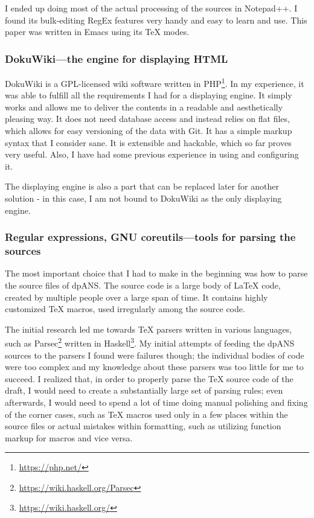 I ended up doing most of the actual processing of the sources in Notepad++. I found its bulk-editing RegEx features very handy and easy to learn and use. This paper was written in Emacs using its TeX modes.

\subsubsection{DokuWiki---the engine for displaying HTML}

DokuWiki is a GPL-licensed wiki software written in PHP\footnote{\url{https://php.net/}}. In my experience, it was able to fulfill all the requirements I had for a displaying engine. It simply works and allows me to deliver the contents in a readable and aesthetically pleasing way. It does not need database access and instead relies on flat files, which allows for easy versioning of the data with Git. It has a simple markup syntax that I consider sane. It is extensible and hackable, which so far proves very useful. Also, I have had some previous experience in using and configuring it.

The displaying engine is also a part that can be replaced later for another solution - in this case, I am not bound to DokuWiki as the only displaying engine.

\subsubsection{Regular expressions, GNU coreutils---tools for parsing the sources}

The most important choice that I had to make in the beginning was how to parse the source files of dpANS. The source code is a large body of \LaTeX{} code, created by multiple people over a large span of time. It contains highly customized \TeX{} macros, used irregularly among the source code.

The initial research led me towards \TeX{} parsers written in various languages, such as Parsec\footnote{\url{https://wiki.haskell.org/Parsec}} written in Haskell\footnote{\url{https://wiki.haskell.org/}}. My initial attempts of feeding the dpANS sources to the parsers I found were failures though; the individual bodies of code were too complex and my knowledge about these parsers was too little for me to succeed. I realized that, in order to properly parse the \TeX{} source code of the draft, I would need to create a substantially large set of parsing rules; even afterwards, I would need to spend a lot of time doing manual polishing and fixing of the corner cases, such as \TeX{} macros used only in a few places within the source files or actual mistakes within formatting, such as utilizing function markup for macros and vice versa.

